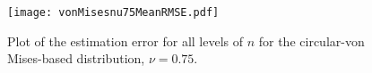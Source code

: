
\begin{figure}[h!]
\centering
\texttt{[image: vonMisesnu75MeanRMSE.pdf]}
\caption{Plot of the estimation error for all levels of $n$ for the circular-von Mises-based distribution,  $\nu=0.75$.}  \label{fig:vmnu75}
\end{figure}

